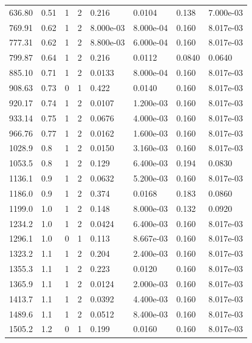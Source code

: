 \documentclass[preview]{standalone}
\begin{document}
{{\begin{tabular}{L{1.2cm}C{1.2cm} C{0.3cm}C{0.5cm} C{1.4cm}C{1.4cm} C{1.4cm}C{1.4cm}}
  636.80  &  0.51  & 1     &  2 &  0.216  & 0.0104  & 0.138 &  7.000e-03   \\ 
  769.91  &  0.62  & 1     &  2 &  8.000e-03  & 8.000e-04  & 0.160 &  8.017e-03   \\ 
  777.31  &  0.62  & 1     &  2 &  8.800e-03  & 6.000e-04  & 0.160 &  8.017e-03   \\ 
  799.87  &  0.64  & 1     &  2 &  0.216  & 0.0112  & 0.0840 &  0.0640   \\ 
  885.10  &  0.71  & 1     &  2 &  0.0133  & 8.000e-04  & 0.160 &  8.017e-03   \\ 
  908.63  &  0.73  & 0     &  1 &  0.422  & 0.0140  & 0.160 &  8.017e-03   \\ 
  920.17  &  0.74  & 1     &  2 &  0.0107  & 1.200e-03  & 0.160 &  8.017e-03   \\ 
  933.14  &  0.75  & 1     &  2 &  0.0676  & 4.000e-03  & 0.160 &  8.017e-03   \\ 
  966.76  &  0.77  & 1     &  2 &  0.0162  & 1.600e-03  & 0.160 &  8.017e-03   \\ 
  1028.9  &   0.8  & 1     &  2 &  0.0150  & 3.160e-03  & 0.160 &  8.017e-03   \\ 
  1053.5  &   0.8  & 1     &  2 &  0.129  & 6.400e-03  & 0.194 &  0.0830   \\ 
  1136.1  &   0.9  & 1     &  2 &  0.0632  & 5.200e-03  & 0.160 &  8.017e-03   \\ 
  1186.0  &   0.9  & 1     &  2 &  0.374  & 0.0168  & 0.183 &  0.0860   \\ 
  1199.0  &   1.0  & 1     &  2 &  0.148  & 8.000e-03  & 0.132 &  0.0920   \\ 
  1234.2  &   1.0  & 1     &  2 &  0.0424  & 6.400e-03  & 0.160 &  8.017e-03   \\ 
  1296.1  &   1.0  & 0     &  1 &  0.113  & 8.667e-03  & 0.160 &  8.017e-03   \\ 
  1323.2  &   1.1  & 1     &  2 &  0.204  & 2.400e-03  & 0.160 &  8.017e-03   \\ 
  1355.3  &   1.1  & 1     &  2 &  0.223  & 0.0120  & 0.160 &  8.017e-03   \\ 
  1365.9  &   1.1  & 1     &  2 &  0.0124  & 2.000e-03  & 0.160 &  8.017e-03   \\ 
  1413.7  &   1.1  & 1     &  2 &  0.0392  & 4.400e-03  & 0.160 &  8.017e-03   \\ 
  1489.6  &   1.1  & 1     &  2 &  0.0512  & 8.400e-03  & 0.160 &  8.017e-03   \\ 
  1505.2  &   1.2  & 0     &  1 &  0.199  & 0.0160  & 0.160 &  8.017e-03   \\ 

\end{tabular}}}
\end{document}
